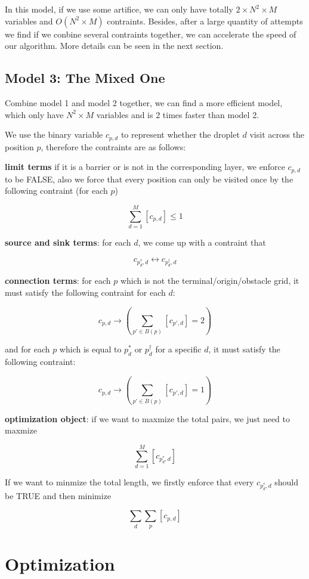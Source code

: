 \documentclass[twocolumn]{article}
\begin{document}
In this model, if we use some artifice, we can only have totally $2 \times N^2 \times M$ variables and $O(N^2 \times M)$ contraints. Besides, after a large quantity of attempts we find if we conbine several contraints together, we can accelerate the speed of our algorithm. More details can be seen in the next section.

\subsection{Model 3: The Mixed One}

Combine model 1 and model 2 together, we can find a more efficient model, which only have $N^2 \times M$ variables and is 2 times faster than model 2.

We use the binary variable $c_{p,d}$ to represent whether the droplet $d$ visit across the position $p$, therefore the contraints are as follows:

\textbf{limit terms} if it is a barrier or is not in the corresponding layer, we enforce $c_{p,d}$ to be FALSE, also we force that every position can only be visited once by the following contraint (for each $p$)

\[
\sum_{d=1}^{M} [c_{p,d}] \le 1
\]

\textbf{source and sink terms}: for each $d$, we come up with a contraint that

\[
c_{p^*_d,d} \leftrightarrow c_{p^\dagger_d,d}
\]

\textbf{connection terms}: for each $p$ which is not the terminal/origin/obstacle grid, it must satisfy the following contraint for each $d$:

\[
c_{p,d} \to (\sum_{p' \in B(p)}[c_{p',d}] = 2)
\]

and for each $p$ which is equal to $p^*_d$ or $p^\dagger_d$ for a specific $d$, it must satisfy the following contraint:

\[
c_{p,d} \to (\sum_{p' \in B(p)}[c_{p',d}] = 1)
\]

\textbf{optimization object}: if we want to maxmize the total pairs, we just need to maxmize

\[
\sum_{d=1}^{M}{[c_{p^*_d,d}]}
\]

If we want to minmize the total length, we firstly enforce that every $c_{p^*_d,d}$ should be TRUE and then minimize

\[
\sum_{d}\sum_{p}{[c_{p,d}]}
\]

\section{Optimization}
\end{document}

